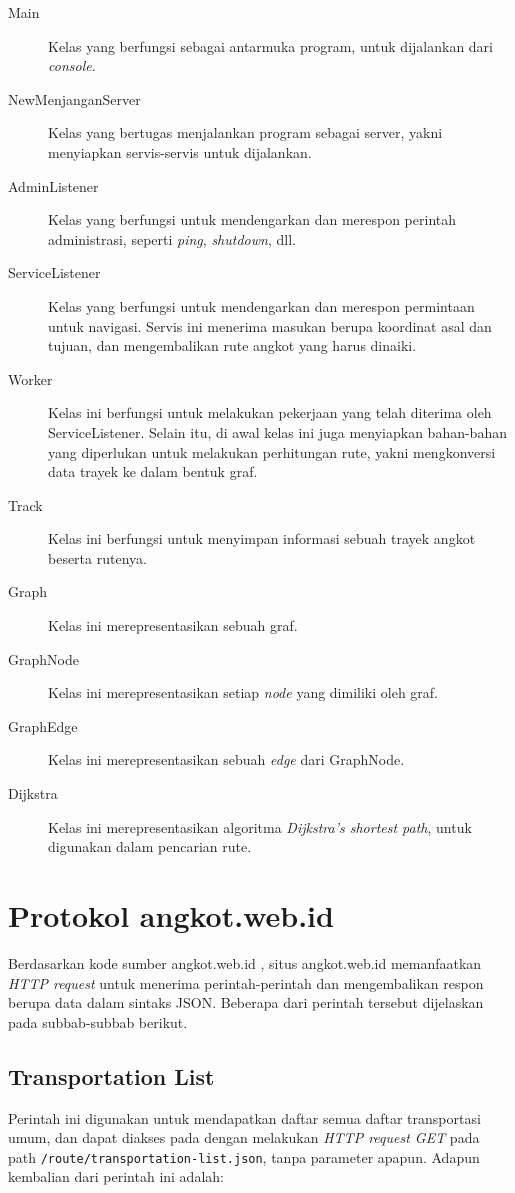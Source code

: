 \begin{description}
	\item[Main] Kelas yang berfungsi sebagai antarmuka program, untuk dijalankan dari \textit{console}.
	\item[NewMenjanganServer] Kelas yang bertugas menjalankan program sebagai server, yakni menyiapkan servis-servis untuk dijalankan.
	\item[AdminListener] Kelas yang berfungsi untuk mendengarkan dan merespon perintah administrasi, seperti \textit{ping}, \textit{shutdown}, dll.
	\item[ServiceListener] Kelas yang berfungsi untuk mendengarkan dan merespon permintaan untuk navigasi. Servis ini menerima masukan berupa koordinat asal dan tujuan, dan mengembalikan rute angkot yang harus dinaiki.
	\item[Worker] Kelas ini berfungsi untuk melakukan pekerjaan yang telah diterima oleh ServiceListener. Selain itu, di awal kelas ini juga menyiapkan bahan-bahan yang diperlukan untuk melakukan perhitungan rute, yakni mengkonversi data trayek ke dalam bentuk graf.
	\item[Track] Kelas ini berfungsi untuk menyimpan informasi sebuah trayek angkot beserta rutenya.
	\item[Graph] Kelas ini merepresentasikan sebuah graf.
	\item[GraphNode] Kelas ini merepresentasikan setiap \textit{node} yang dimiliki oleh graf.
	\item[GraphEdge] Kelas ini merepresentasikan sebuah \textit{edge} dari GraphNode.
	\item[Dijkstra] Kelas ini merepresentasikan algoritma \textit{Dijkstra's shortest path}\cite{Cormen:2001}, untuk digunakan dalam pencarian rute.
\end{description}

\section{Protokol angkot.web.id}

Berdasarkan kode sumber angkot.web.id \cite{angkotwebid}, situs angkot.web.id memanfaatkan \textit{HTTP request} \cite{rfc7231} untuk menerima perintah-perintah dan mengembalikan respon berupa data dalam sintaks JSON. Beberapa dari perintah tersebut dijelaskan pada subbab-subbab berikut.

\subsection{Transportation List}
Perintah ini digunakan untuk mendapatkan daftar semua daftar transportasi umum, dan dapat diakses pada dengan melakukan \textit{HTTP request GET} pada path \texttt{/route/transportation-list.json}, tanpa parameter apapun. Adapun kembalian dari perintah ini adalah:

